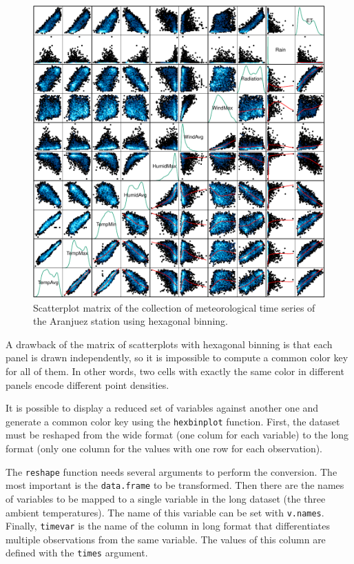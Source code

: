 \begin{figure}[htb]
\centering
\includegraphics[width=.9\linewidth]{figs/aranjuezSplomHexbin.pdf}
\caption{\label{fig:orgparagraph2}
Scatterplot matrix of the collection of meteorological time series of the Aranjuez station using hexagonal binning.}
\end{figure}

A drawback of the matrix of scatterplots with hexagonal binning is
that each panel is drawn independently, so it is impossible to compute
a common color key for all of them. In other words, two cells with
exactly the same color in different panels encode different point
densities.

It is possible to display a reduced set of variables against
another one and generate a common color key using the \texttt{hexbinplot}
function. First, the dataset must be reshaped from the wide format
(one colum for each variable) to the long format (only one column for
the values with one row for each observation). 

The \texttt{reshape} function needs several arguments to perform the
conversion. The most important is the \texttt{data.frame} to be
transformed. Then there are the names of variables to be mapped to
a single variable in the long dataset (the three ambient
temperatures). The name of this variable can be set with
\texttt{v.names}. Finally, \texttt{timevar} is the name of the column in long format that
differentiates multiple observations from the same variable. The
values of this column are defined with the \texttt{times} argument.

